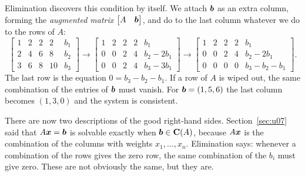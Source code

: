 Elimination discovers this condition by itself. We attach $\boldsymbol{b}$ as an extra column, forming
the \emph{augmented matrix} $\begin{bmatrix}A&\boldsymbol{b}\end{bmatrix}$, and do to the last column
whatever we do to the rows of $A$:
\[
\left[\begin{array}{cccc|c}1&2&2&2&b_1\\2&4&6&8&b_2\\3&6&8&10&b_3\end{array}\right]
\longrightarrow
\left[\begin{array}{cccc|c}1&2&2&2&b_1\\0&0&2&4&b_2-2b_1\\0&0&2&4&b_3-3b_1\end{array}\right]
\longrightarrow
\left[\begin{array}{cccc|c}1&2&2&2&b_1\\0&0&2&4&b_2-2b_1\\0&0&0&0&b_3-b_2-b_1\end{array}\right].
\]
The last row is the equation $0=b_3-b_2-b_1$. If a row of $A$ is wiped out, the same
combination of the entries of $\boldsymbol{b}$ must vanish. For $\boldsymbol{b}=(1,5,6)$ the last column becomes
$(1,3,0)$ and the system is consistent.

There are now two descriptions of the good right-hand sides. Section~\ref{sec:u07} said that
$A\boldsymbol{x}=\boldsymbol{b}$ is solvable exactly when $\boldsymbol{b}\in\mathbf{C}(A)$, because $A\boldsymbol{x}$ is the combination
of the columns with weights $x_1,\dots,x_n$. Elimination says: whenever a combination of the
rows gives the zero row, the same combination of the $b_i$ must give zero. These are not
obviously the same, but they are.

